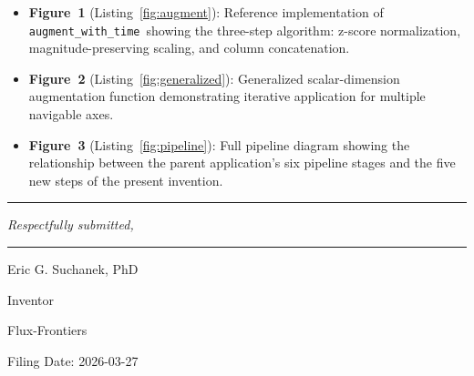 \documentclass[12pt,letterpaper]{article}
\newcommand{\augtime}{\texttt{augment\_with\_time}}
\begin{document}
\begin{itemize}
  \item \textbf{Figure~1} (Listing~\ref{fig:augment}): Reference implementation
    of \augtime\ showing the three-step algorithm: z-score normalization,
    magnitude-preserving scaling, and column concatenation.

  \item \textbf{Figure~2} (Listing~\ref{fig:generalized}): Generalized
    scalar-dimension augmentation function demonstrating iterative application
    for multiple navigable axes.

  \item \textbf{Figure~3} (Listing~\ref{fig:pipeline}): Full pipeline diagram
    showing the relationship between the parent application's six pipeline
    stages and the five new steps of the present invention.
\end{itemize}

\bigskip
\noindent\rule{\textwidth}{0.4pt}

\bigskip

\noindent\textit{Respectfully submitted,}

\vspace{2em}

\noindent\rule{3in}{0.4pt}

\noindent Eric G. Suchanek, PhD

\noindent Inventor

\noindent Flux-Frontiers

\vspace{1em}

\noindent Filing Date: 2026-03-27
\end{document}
